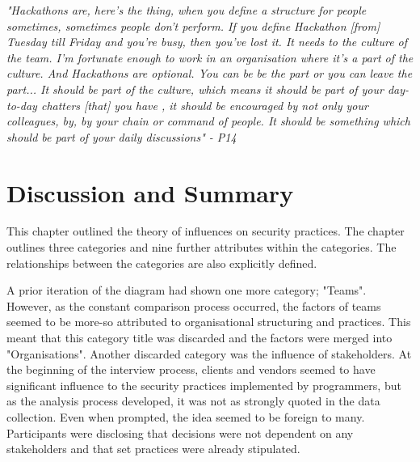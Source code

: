 \newline
\par
\textit{"Hackathons are, here's the thing, when you define a structure for people sometimes, sometimes people don't perform. If you define Hackathon [from] Tuesday till Friday and you're busy, then you've lost it. It needs to the culture of the team. I'm fortunate enough to work in an organisation where it's a part of the culture. And Hackathons are optional. You can be be the part or you can leave the part... It should be part of the culture, which means it should be part of your day-to-day chatters [that] you have , it should be encouraged by not only your colleagues, by, by your chain or command of people. It should be something which should be part of your daily discussions" - P14 }

\section{Discussion and Summary}

This chapter outlined the theory of influences on security practices. The chapter outlines three categories and nine further attributes within the categories. The relationships between the categories are also explicitly defined. 
\newline
\par
A prior iteration of the diagram had shown one more category; "Teams". However, as the constant comparison process occurred, the factors of teams seemed to be more-so attributed to organisational structuring and practices. This meant that this category title was discarded and the factors were merged into "Organisations". Another discarded category was the influence of stakeholders. At the beginning of the interview process, clients and vendors seemed to have significant influence to the security practices implemented by programmers, but as the analysis process developed, it was not as strongly quoted in the data collection. Even when prompted, the idea seemed to be foreign to many. Participants were disclosing that decisions were not dependent on any stakeholders and that set practices were already stipulated.